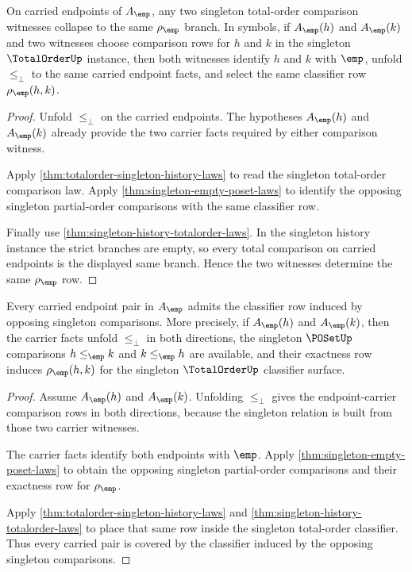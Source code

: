 \begin{theorem}
\label{thm:totalorder-singleton-comparison-determinacy}
On carried endpoints of $A_{\emp}$, any two singleton total-order comparison
witnesses collapse to the same $\rho_{\emp}$ branch. In symbols, if
$A_{\emp}(h)$ and $A_{\emp}(k)$ and two witnesses choose comparison rows for
$h$ and $k$ in the singleton $\TotalOrderUp$ instance, then both witnesses
identify $h$ and $k$ with $\emp$, unfold $\le_{\bot}$ to the same carried
endpoint facts, and select the same classifier row $\rho_{\emp}(h,k)$.
\end{theorem}
\begin{proof}
Unfold $\le_{\bot}$ on the carried endpoints. The hypotheses
$A_{\emp}(h)$ and $A_{\emp}(k)$ already provide the two carrier facts required
by either comparison witness.

Apply \autoref{thm:totalorder-singleton-history-laws} to read the singleton
total-order comparison law. Apply
\autoref{thm:singleton-empty-poset-laws} to identify the opposing singleton
partial-order comparisons with the same classifier row.

Finally use \autoref{thm:singleton-history-totalorder-laws}. In the singleton
history instance the strict branches are empty, so every total comparison on
carried endpoints is the displayed same branch. Hence the two witnesses
determine the same $\rho_{\emp}$ row.
\end{proof}

\begin{theorem}
\label{thm:totalorder-singleton-classifier-coverage}
Every carried endpoint pair in $A_{\emp}$ admits the classifier row induced by
opposing singleton comparisons. More precisely, if $A_{\emp}(h)$ and
$A_{\emp}(k)$, then the carrier facts unfold $\le_{\bot}$ in both directions,
the singleton $\POSetUp$ comparisons $h\le_{\emp}k$ and $k\le_{\emp}h$ are
available, and their exactness row induces $\rho_{\emp}(h,k)$ for the
singleton $\TotalOrderUp$ classifier surface.
\end{theorem}
\begin{proof}
Assume $A_{\emp}(h)$ and $A_{\emp}(k)$. Unfolding $\le_{\bot}$ gives the
endpoint-carrier comparison rows in both directions, because the singleton
relation is built from those two carrier witnesses.

The carrier facts identify both endpoints with $\emp$. Apply
\autoref{thm:singleton-empty-poset-laws} to obtain the opposing singleton
partial-order comparisons and their exactness row for $\rho_{\emp}$.

Apply \autoref{thm:totalorder-singleton-history-laws} and
\autoref{thm:singleton-history-totalorder-laws} to place that same row inside
the singleton total-order classifier. Thus every carried pair is covered by
the classifier induced by the opposing singleton comparisons.
\end{proof}
